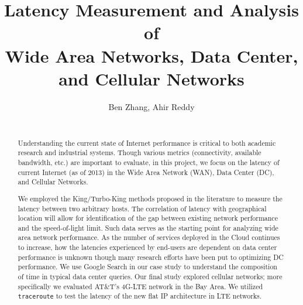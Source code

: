 \documentclass{sig-alternate-10pt}
\begin{document}


\setlength{\paperheight}{11in}
\setlength{\paperwidth}{8.5in}
\setlength{\pdfpageheight}{\paperheight}
\setlength{\pdfpagewidth}{\paperwidth}

\setlength{\textfloatsep}{13pt plus 2pt minus 1pt}

\title{Latency Measurement and Analysis of \\ Wide Area Networks, Data Center, and Cellular Networks}

\author{
{Ben Zhang, Ahir Reddy}\\
\\
}

\maketitle

\begin{abstract}
Understanding the current state of Internet performance is critical to both academic research and industrial systems. Though various metrics (connectivity, available bandwidth, etc.) are important to evaluate, in this project, we focus on the latency of current Internet (as of 2013) in the Wide Area Network (WAN), Data Center (DC), and Cellular Networks.

We employed the King/Turbo-King methods proposed in the literature to measure the latency between two arbitrary hosts. The correlation of latency with geographical location will allow for identification of the gap between existing network performance and the speed-of-light limit. Such data serves as the starting point for analyzing wide area network performance. As the number of services deployed in the Cloud continues to increase, how the latencies experienced by end-users are dependent on data center performance is unknown though many research efforts have been put to optimizing DC performance. We use Google Search in our case study to understand the composition of time in typical data center queries. Our final study explored cellular networks; more specifically we evaluated AT\&T's 4G-LTE network in the Bay Area. We utilized \texttt{traceroute} to test the latency of the new flat IP architecture in LTE networks.

\end{abstract}
\end{document}
